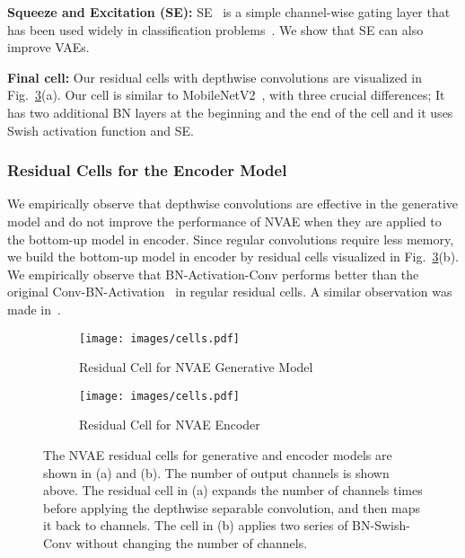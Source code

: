 \documentclass{article}
\begin{document}
\textbf{Squeeze and Excitation (SE):} SE~\cite{hu2017squeeze} is a simple channel-wise gating layer that has been used widely in classification problems~\cite{tan2019efficientnet}. We show that SE can also improve VAEs. 

\textbf{Final cell:} Our residual cells with depthwise convolutions are visualized in Fig.~\ref{fig:cells}(a). Our cell is similar to MobileNetV2~\cite{sandler2018mobilenetv2}, with three crucial differences; It has two additional BN layers at the beginning and the end of the cell and it uses Swish activation function and SE.

\subsubsection{Residual Cells for the Encoder Model}
We empirically observe that depthwise convolutions are effective in the generative model and do not improve the performance of NVAE when they are applied to the bottom-up model in encoder. Since regular convolutions require less memory, we build the bottom-up model in encoder by residual cells visualized in Fig.~\ref{fig:cells}(b). We empirically observe that BN-Activation-Conv performs better than the original Conv-BN-Activation~\cite{he2016deep} in regular residual cells. A similar observation was made in~\cite{he2016identity}.

\begin{figure}
\vspace{-1cm}
\centering
\begin{subfigure}[b]{.55\textwidth}
\centering
    \setlength{\belowcaptionskip}{0pt}
    \texttt{[image: images/cells.pdf]}
    \caption{Residual Cell for NVAE Generative Model}
    \label{fig:cell_dec}
\end{subfigure} \hspace{0.2cm}
\begin{subfigure}[b]{.4\textwidth}
\centering
    \setlength{\belowcaptionskip}{0pt}
    \texttt{[image: images/cells.pdf]}
    \caption{Residual Cell for NVAE Encoder}
    \label{fig:cell_enc}
\end{subfigure}
\caption{The NVAE residual cells for generative and encoder models are shown in (a) and (b). The number of output channels is shown above.  The residual cell in (a) expands the number of channels  times before applying the depthwise separable convolution, and then maps it back to  channels. The cell in (b) applies two series of BN-Swish-Conv without changing the number of channels.}
\label{fig:cells}
\vspace{-0.2cm}
\end{figure}
\end{document}

